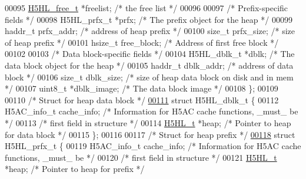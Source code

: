 \begin{DoxyCode}
00095     \hyperlink{struct_h5_h_l__free__t}{H5HL\_free\_t}     *freelist;          \textcolor{comment}{/* the free list                                        
              */}
00096 
00097     \textcolor{comment}{/* Prefix-specific fields */}
00098     H5HL\_prfx\_t     *prfx;              \textcolor{comment}{/* The prefix object for the heap                       */}
00099     haddr\_t         prfx\_addr;          \textcolor{comment}{/* address of heap prefix                               */}
00100     \textcolor{keywordtype}{size\_t}          prfx\_size;          \textcolor{comment}{/* size of heap prefix                                  */}
00101     hsize\_t         free\_block;         \textcolor{comment}{/* Address of first free block                          */}
00102 
00103     \textcolor{comment}{/* Data block-specific fields */}
00104     H5HL\_dblk\_t     *dblk;              \textcolor{comment}{/* The data block object for the heap                   */}
00105     haddr\_t         dblk\_addr;          \textcolor{comment}{/* address of data block                                */}
00106     \textcolor{keywordtype}{size\_t}          dblk\_size;          \textcolor{comment}{/* size of heap data block on disk and in mem           */}
00107     uint8\_t         *dblk\_image;        \textcolor{comment}{/* The data block image                                 */}
00108 \};
00109 
00110 \textcolor{comment}{/* Struct for heap data block */}
\hyperlink{struct_h5_h_l__dblk__t}{00111} \textcolor{keyword}{struct }H5HL\_dblk\_t \{
00112     H5AC\_info\_t     cache\_info;         \textcolor{comment}{/* Information for H5AC cache functions, \_must\_ be      */}
00113                                         \textcolor{comment}{/* first field in structure                             */}
00114     \hyperlink{struct_h5_h_l__t}{H5HL\_t}          *heap;              \textcolor{comment}{/* Pointer to heap for data block                       */}
00115 \};
00116 
00117 \textcolor{comment}{/* Struct for heap prefix */}
\hyperlink{struct_h5_h_l__prfx__t}{00118} \textcolor{keyword}{struct }H5HL\_prfx\_t \{
00119     H5AC\_info\_t     cache\_info;         \textcolor{comment}{/* Information for H5AC cache functions, \_must\_ be      */}
00120                                         \textcolor{comment}{/* first field in structure                             */}
00121     \hyperlink{struct_h5_h_l__t}{H5HL\_t}          *heap;              \textcolor{comment}{/* Pointer to heap for prefix                           */}

\end{DoxyCode}
